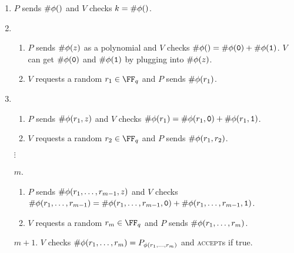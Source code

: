 \documentclass{standalone}
\begin{document}
\begin{enumerate}[start=0, nosep]
	\item \(P\) sends \(\operatorname{\textsf\#\phi}()\) and \(V\) checks \(k = \operatorname{\textsf\#\phi}()\).

	\item \begin{enumerate}
		\item \(P\) sends \(\operatorname{\textsf\#\phi}(z)\) as a polynomial and
          \(V\) checks \(\operatorname{\textsf\#\phi}() = \operatorname{\textsf\#\phi}(\texttt 0) + \operatorname{\textsf\#\phi}(\texttt 1)\).
          \(V\) can get \(\operatorname{\textsf\#\phi}(\mathtt 0)\) and \(\operatorname{\textsf\#\phi}(\mathtt 1)\)
          by plugging into \(\operatorname{\textsf\#\phi}(z)\).

		\item \(V\) requests a random \(r_1 \in \FF_q\) and
          \(P\) sends \(\operatorname{\textsf\#\phi}(r_1)\).
	\end{enumerate}

	\item \begin{enumerate}
		\item \(P\) sends \(\operatorname{\textsf\#\phi}(r_1, z)\) and
          \(V\) checks \(\operatorname{\textsf\#\phi}(r_1) = \operatorname{\textsf\#\phi}(r_1, \texttt 0) +
                                        \operatorname{\textsf\#\phi}(r_1, \texttt 1)\).

		\item \(V\) requests a random \(r_2 \in \FF_q\) and
          \(P\) sends \(\operatorname{\textsf\#\phi}(r_1, r_2)\).
	\end{enumerate}

	\item[\(\vdots\)]

	\item[\(m\).] \begin{enumerate}
		\item \(P\) sends \(\operatorname{\textsf\#\phi}(r_1, \dots, r_{m - 1}, z)\) and
          \(V\) checks \(\operatorname{\textsf\#\phi}(r_1, \dots, r_{m - 1}) =
                \operatorname{\textsf\#\phi}(r_1, \dots, r_{m - 1}, \texttt 0) +
                \operatorname{\textsf\#\phi}(r_1, \dots, r_{m - 1}, \texttt 1)\).

		\item \(V\) requests a random \(r_m \in \FF_q\) and
          \(P\) sends \(\operatorname{\textsf\#\phi}(r_1, \dots, r_m)\).
	\end{enumerate}

	\item[\(m + 1\).] \(V\) checks
                    \(\operatorname{\textsf\#\phi}(r_1, \dots, r_m) = P_{\phi(r_1, \dots, r_m)}\)
                    and \textsc{accept}s if true.
\end{enumerate}
\end{document}
